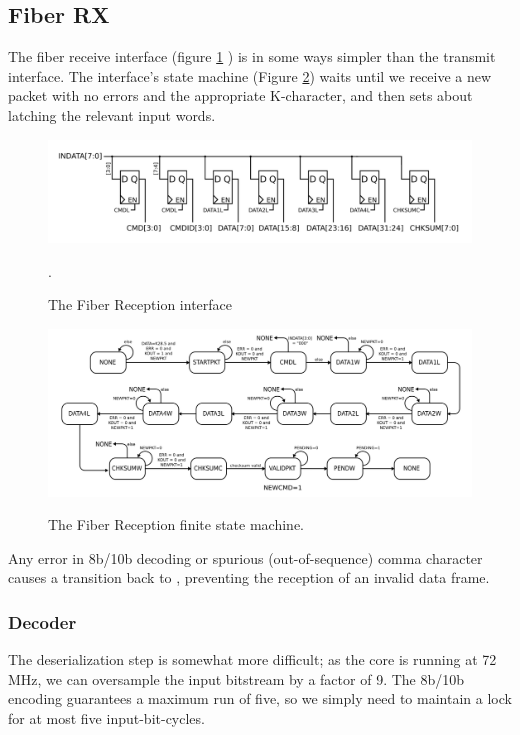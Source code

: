 \subsection{Fiber RX}

The fiber receive interface (figure \ref{fiberrx} ) is in some ways
simpler than the transmit interface. The interface's state machine
(Figure \ref{fiberrxfsm}) waits until we receive a new packet with no
errors and the appropriate K-character, and then sets about latching
the relevant input words.

\begin{figure}[h!]
\includegraphics[scale=1.0]{fiberRX.svg}
\label{fiberrx}
\caption{The Fiber Reception interface}. 
\end{figure}

\begin{figure}[h!]
\includegraphics[scale=1.0]{fiberRX.fsm.svg}
\label{fiberrxfsm}
\caption{The Fiber Reception finite state machine.}
\end{figure}

Any error in 8b/10b decoding or spurious (out-of-sequence) comma
character causes a transition back to , preventing the
reception of an invalid data frame.

\subsubsection{Decoder}

The deserialization step is somewhat more difficult; as the core is
running at 72 MHz, we can oversample the input bitstream by a factor
of 9. The 8b/10b encoding guarantees a maximum run of five, so we
simply need to maintain a lock for at most five input-bit-cycles.

